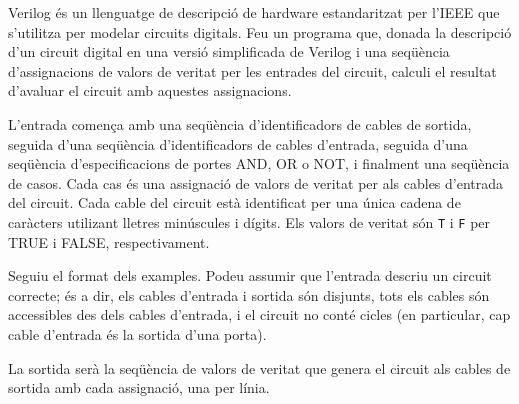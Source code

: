 

\Statement

Verilog és un llenguatge de descripció de hardware estandaritzat per
l'IEEE que s'utilitza per modelar circuits digitals. Feu un programa
que, donada la descripció d'un circuit digital en una versió
simplificada de Verilog i una seqüència d'assignacions de valors de
veritat per les entrades del circuit, calculi el resultat d'avaluar el
circuit amb aquestes assignacions.




\Input

L'entrada comença amb una seqüència d'identificadors de cables de
sortida, seguida d'una seqüència d'identificadors de cables d'entrada,
seguida d'una seqüència d'especificacions de portes AND, OR o NOT, i
finalment una seqüència de casos. Cada cas és una assignació de valors
de veritat per als cables d'entrada del circuit. Cada cable del
circuit està identificat per una única cadena de caràcters utilizant
lletres minúscules i dígits. Els valors de veritat són \texttt{T} i
\texttt{F} per TRUE i FALSE, respectivament. \medskip

Seguiu el format dels examples. Podeu assumir que l'entrada descriu un
circuit correcte; és a dir, els cables d'entrada i sortida són
disjunts, tots els cables són accessibles des dels cables d'entrada, i
el circuit no conté cicles (en particular, cap cable d'entrada és la
sortida d'una porta).

\Output

La sortida serà la seqüència de valors de veritat que genera el
circuit als cables de sortida amb cada assignació, una per línia.

\Sample

